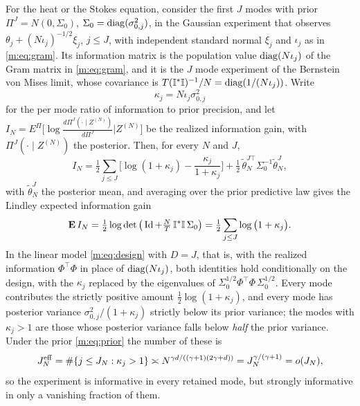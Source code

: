 \begin{proposition}\label{m:prop:pr}
For the heat or the Stokes equation, consider the first $J$ modes with prior $\Pi^J=N(0,\Sigma_0)$, $\Sigma_0=\operatorname{diag}(\sigma^2_{0,j})$, in the Gaussian experiment that observes $\theta_j+(N\iota_j)^{-1/2}\xi_j$, $j\le J$, with independent standard normal $\xi_j$ and $\iota_j$ as in \eqref{m:eq:gram}. Its information matrix is the population value $\operatorname{diag}(N\iota_j)$ of the Gram matrix in \eqref{m:eq:gram}, and it is the $J$ mode experiment of the Bernstein von Mises limit, whose covariance is $T(\mathbb{I}^*\mathbb{I})^{-1}/N=\operatorname{diag}(1/(N\iota_j))$. Write
\[
\kappa_j=N\iota_j\sigma^2_{0,j}
\]
for the per mode ratio of information to prior precision, and let $I_N=E^{\Pi}\big[\log\tfrac{d\Pi^J(\cdot\mid Z^{(N)})}{d\Pi^J}\big|Z^{(N)}\big]$ be the realized information gain, with $\Pi^J(\cdot\mid Z^{(N)})$ the posterior. Then, for every $N$ and $J$,
\[
I_N=\tfrac12\sum_{j\le J}\Big[\log(1+\kappa_j)-\frac{\kappa_j}{1+\kappa_j}\Big]+\tfrac12\,\tilde\theta_N^{J\top}\Sigma_0^{-1}\tilde\theta^J_N ,
\]
with $\tilde\theta^J_N$ the posterior mean, and averaging over the prior predictive law gives the Lindley expected information gain
\[
\mathbf{E}\,I_N=\tfrac12\log\det\big(\operatorname{Id}+\tfrac NT\,\mathbb{I}^*\mathbb{I}\,\Sigma_0\big)=\tfrac12\sum_{j\le J}\log\big(1+\kappa_j\big) .
\]
In the linear model \eqref{m:eq:design} with $D=J$, that is, with the realized information $\Phi^\top\Phi$ in place of $\operatorname{diag}(N\iota_j)$, both identities hold conditionally on the design, with the $\kappa_j$ replaced by the eigenvalues of $\Sigma_0^{1/2}\Phi^\top\Phi\,\Sigma_0^{1/2}$.
Every mode contributes the strictly positive amount $\tfrac12\log(1+\kappa_j)$, and every mode has posterior variance $\sigma^2_{0,j}/(1+\kappa_j)$ strictly below its prior variance; the modes with $\kappa_j>1$ are those whose posterior variance falls below \emph{half} the prior variance. Under the prior \eqref{m:eq:prior} the number of these is
\[
J^{\rm eff}_N=\#\{j\le J_N:\kappa_j>1\}\asymp N^{\gamma d/((\gamma+1)(2\gamma+d))}=J_N^{\gamma/(\gamma+1)}=o(J_N) ,
\]
so the experiment is informative in every retained mode, but strongly informative in only a vanishing fraction of them.
\end{proposition}


